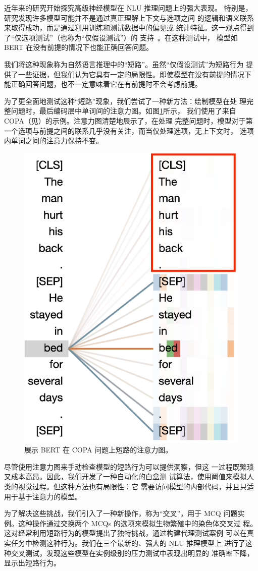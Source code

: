 近年来的研究开始探究高级神经模型在 NLU 推理问题上的强大表现。
特别是，研究发现许多模型可能并不是通过真正理解上下文与选项之间
的逻辑和语义联系来取得成功，而是通过利用训练和测试数据中的偏见或
统计特征。这一观点得到了``仅选项测试''（也称为``仅假设测试''）的
支持~\cite{sharma2018tackling,bras2020adversarial}。在这种测试中，
模型如 BERT 在没有前提的情况下也能正确回答问题。

我们将这种现象称为自然语言推理中的``短路''。虽然``仅假设测试''为短路行为
提供了一些证据，但我们认为它具有一定的局限性。即使模型在没有前提的情况下
能正确回答问题，也不一定意味着它在有前提时不会考虑前提。

为了更全面地测试这种``短路''现象，我们尝试了一种新方法：绘制模型在处
理完整问题时，最后编码层中单词间的注意力图。如图\ref{fig3:att-goodex}所示，
我们使用了来自 COPA（见）的示例。注意力图清楚地展示了，在处理
完整问题时，模型对于第一个选项与前提之间的联系几乎没有关注，而当仅处理选项，无上下文时，
选项内单词之间的注意力保持不变。

\begin{figure}[th!]
\centering
\includegraphics[width=0.5\columnwidth]{figures/ecai/end_related.eps}
\caption{展示 BERT\cite{devlin2018bert} 在 COPA 问题上短路的注意力图。}
\label{fig3:att-goodex}
\end{figure}

尽管使用注意力图来手动检查模型的短路行为可以提供洞察，但这
一过程既繁琐又成本高昂。因此，我们开发了一种自动化的白盒测
试算法，使用阈值来模拟人类的视觉过程。但这种方法也有局限性：它
需要访问模型的内部代码，并且只适用于基于注意力的模型。

为了解决这些挑战，我们引入了一种新操作，称为``交叉''，用于 MCQ 问题实
例。这种操作通过交换两个 MCQs 的选项来模拟生物繁殖中的染色体交叉过
程。这对经常利用短路行为的模型提出了独特挑战，通过构建代理测试案例
可以在真实任务中检测这种行为。我们在三个最新的、强大的 NLU 推理模型上
进行了这种交叉测试，发现这些模型在实例级别的压力测试中表现出明显的
准确率下降，显示出短路行为。

